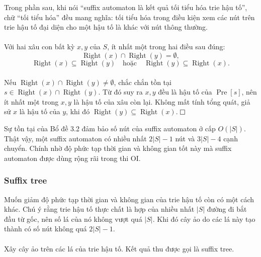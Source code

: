 \documentclass[11pt]{article}
\newcommand{\proofbox}{\ensuremath{\vcenter{\hrule height 0.45pt
  \hbox{\vrule width 0.45pt height 6pt\kern 6pt\vrule width 0.45pt}
  \hrule height 0.45pt}}}
\begin{document}
Trong phần sau, khi nói ``suffix automaton là kết quả tối tiểu hóa trie hậu
tố'', chữ ``tối tiểu hóa'' đều mang nghĩa: tối tiểu hóa trong điều kiện xem các
nút trên trie hậu tố đại diện cho một hậu tố là khác với nút thông thường.

\paragraph{}
Với hai xâu con bất kỳ \(x,y\) của \(S\), ít nhất một trong hai điều sau đúng:
\[
\operatorname{Right}(x)\cap\operatorname{Right}(y)=\emptyset,
\]
\[
\operatorname{Right}(x)\subseteq\operatorname{Right}(y)
\quad\text{hoặc}\quad
\operatorname{Right}(y)\subseteq\operatorname{Right}(x).
\]

\paragraph{}
Nếu \(\operatorname{Right}(x)\cap\operatorname{Right}(y)\ne\emptyset\), chắc
chắn tồn tại \(s\in\operatorname{Right}(x)\cap\operatorname{Right}(y)\). Từ đó
suy ra \(x,y\) đều là hậu tố của \(\operatorname{Pre}[s]\), nên ít nhất một
trong \(x,y\) là hậu tố của xâu còn lại. Không mất tính tổng quát, giả sử \(x\)
là hậu tố của \(y\), khi đó
\(\operatorname{Right}(y)\subseteq\operatorname{Right}(x)\). \proofbox

Sự tồn tại của Bổ đề 3.2 đảm bảo số nút của suffix automaton ở cấp \(O(|S|)\).
Thật vậy, một suffix automaton có nhiều nhất \(2|S|-1\) nút và \(3|S|-4\) cạnh
chuyển. Chính nhờ độ phức tạp thời gian và không gian tốt này mà suffix
automaton được dùng rộng rãi trong thi OI.

\subsubsection{Suffix tree}

Muốn giảm độ phức tạp thời gian và không gian của trie hậu tố còn có một cách
khác. Chú ý rằng trie hậu tố thực chất là hợp của nhiều nhất \(|S|\) đường đi
bắt đầu từ gốc, nên số lá của nó không vượt quá \(|S|\). Khi đó cây ảo do các
lá này tạo thành có số nút không quá \(2|S|-1\).

\paragraph{}
Xây cây ảo trên các lá của trie hậu tố. Kết quả thu được gọi là suffix tree.
\end{document}
